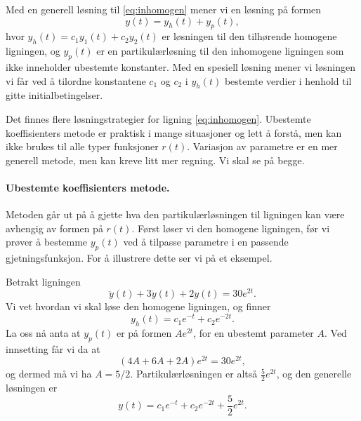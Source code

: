 \documentclass{article}
\theoremstyle{definition}
\newenvironment{defn}
{\pushQED{\qed}\renewcommand{\qedsymbol}{$\triangle$}\defnx}
{\popQED\enddefnx}
\newenvironment{ex}
{\pushQED{\qed}\renewcommand{\qedsymbol}{$\triangle$}\exx}
{\popQED\endexx}
\theoremstyle{remark}
\begin{document}
\begin{multicols*}{2}
\begin{defn}
    Med en generell løsning til \eqref{eq:inhomogen} mener vi en løsning på formen
    \begin{equation*}
        y(t) = y_h(t) + y_p(t),    
    \end{equation*}
    hvor $y_h(t) = c_1 y_1(t) + c_2 y_2(t)$ er løsningen til den tilhørende homogene ligningen, og $y_p(t)$ er en partikulærløsning til den inhomogene ligningen som ikke inneholder ubestemte konstanter. Med en spesiell løsning mener vi løsningen vi får ved å tilordne konstantene $c_1$ og $c_2$ i $y_h(t)$ bestemte verdier i henhold til gitte initialbetingelser.
\end{defn}

Det finnes flere løsningstrategier for ligning \eqref{eq:inhomogen}. Ubestemte koeffisienters metode er praktisk i mange situasjoner og lett å forstå, men kan ikke brukes til alle typer funksjoner $r(t)$. Variasjon av parametre er en mer generell metode, men kan kreve litt mer regning. Vi skal se på begge.

\paragraph*{Ubestemte koeffisienters metode.} Metoden går ut på å gjette hva den partikulærløsningen til ligningen kan være avhengig av formen på $r(t)$. Først løser vi den homogene ligningen, før vi prøver å bestemme $y_p(t)$ ved å tilpasse parametre i en passende gjetningsfunksjon. For å illustrere dette ser vi på et eksempel.

\begin{ex}
  Betrakt ligningen
  \begin{equation*}
    \ddot{y}(t) + 3 \dot{y}(t) + 2 y(t) = 30 e^{2 t}.
  \end{equation*}
  Vi vet hvordan vi skal løse den homogene ligningen, og finner
  \begin{equation*}
    y_h(t) = c_1 e^{-t} + c_2 e^{-2 t}.
  \end{equation*}
  La oss nå anta at $y_p(t)$ er på formen $A e^{2t}$, for en ubestemt parameter $A$. Ved innsetting får vi da at
  \begin{equation*}
    (4 A + 6 A + 2 A) e^{2 t} = 30 e^{2 t},
  \end{equation*}
  og dermed må vi ha $A = 5/2$. Partikulærløsningen er altså $\frac{5}{2} e^{2 t}$, og den generelle løsningen er
  \begin{equation*}
    y(t) = c_1 e^{-t} + c_2 e^{-2 t} + \frac{5}{2} e^{2 t}.
  \end{equation*}
\end{ex}


\end{multicols*}
\end{document}
